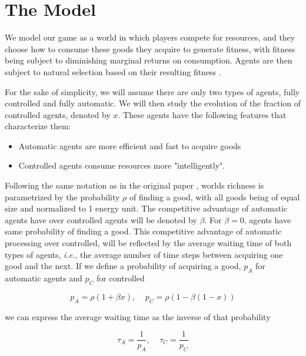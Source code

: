 \documentclass[10pt,a4paper]{article}
\begin{document}
\section{The Model}

We model our game as a world in which players compete for resources, and they choose how to consume these goods they acquire to generate fitness, with 
fitness being subject to diminishing marginal returns on consumption. Agents are then subject to natural selection based on their resulting fitness \cite{Strogatz:evolutionary}.

For the sake of simplicity, we will assume there are only two types of agents, fully controlled and fully automatic. We will then study the evolution of the 
fraction of controlled agents, denoted by $x$. These agents have the following features that characterize them:

\begin{itemize}
 \item Automatic agents are more efficient and fast to acquire goods
 \item Controlled agents consume resources more "intelligently".
\cite{Simulations:code}
\end{itemize}

Following the same notation as in the original paper \cite{Strogatz:evolutionary}, worlds richness is parametrized by the probability $\rho$ of finding a good,
with all goods being of equal size and normalized to 1 energy unit. The competitive advantage of automatic agents have over controlled agents will be denoted by
$\beta$. For $\beta=0$, agents have same probability of finding a good. This competitive advantage of automatic processing over controlled, will be reflected by
the average waiting time of both types of agents, \emph{i.e.}, the average number of time steps between acquiring one good and the next. If we define a probability
of acquiring a good, $p_A$ for automatic agents and $p_C$ for controlled

\begin{equation}
p_A = \rho(1+\beta x), \; \; \; \; p_C = \rho(1-\beta(1- x))
\label{eq:probability}
\end{equation}

\noindent we can express the average waiting time as the inverse of that probability

\begin{equation}
 \tau_A = \frac{1}{p_A}, \; \; \; \; \tau_C = \frac{1}{p_C}
 \label{eq:tau}
\end{equation}
\end{document}
